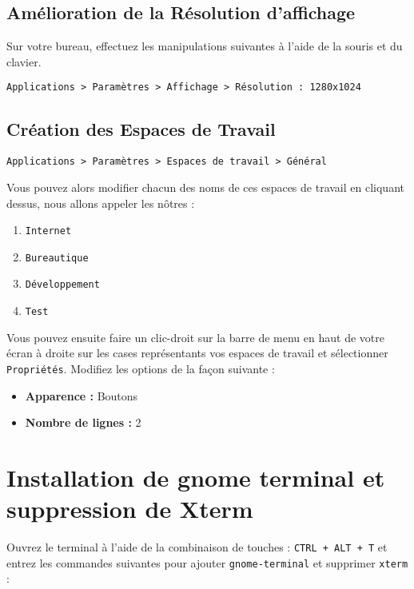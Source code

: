 \subsection{Amélioration de la Résolution d'affichage}

Sur votre bureau, effectuez les manipulations suivantes à l'aide de la souris et du clavier.

\begin{verbatim}
Applications > Paramètres > Affichage > Résolution : 1280x1024
\end{verbatim}

\subsection{Création des Espaces de Travail}

\begin{verbatim}
Applications > Paramètres > Espaces de travail > Général
\end{verbatim}

Vous pouvez alors modifier chacun des noms de ces espaces de travail en cliquant dessus, nous allons appeler les nôtres :

\begin{enumerate}
	\item \texttt{Internet}
	\item \texttt{Bureautique}
	\item \texttt{Développement}
	\item \texttt{Test}
\end{enumerate}

Vous pouvez ensuite faire un clic-droit sur la barre de menu en haut de votre écran à droite sur les cases représentants vos espaces de travail et sélectionner \texttt{Propriétés}. Modifiez les options de la façon suivante :

\begin{itemize}
	\item \textbf{Apparence :} Boutons
	\item \textbf{Nombre de lignes :} 2
\end{itemize}

\section{Installation de gnome terminal et suppression de Xterm}

Ouvrez le terminal à l'aide de la combinaison de touches : \texttt{CTRL + ALT + T} et entrez les commandes suivantes pour ajouter \texttt{gnome-terminal} et supprimer \texttt{xterm} :

